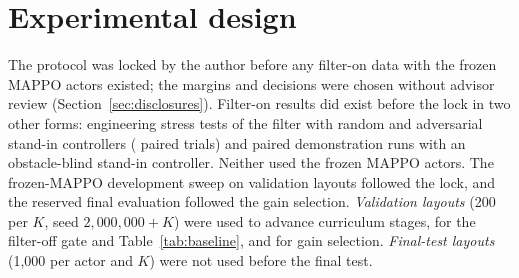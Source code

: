 \documentclass[11pt]{article}
\begin{document}
\section{Experimental design}\label{sec:design}
The protocol was locked by the author before any filter-on data with the frozen MAPPO actors
existed; the margins and decisions were chosen without advisor review
(Section~\ref{sec:disclosures}). Filter-on results did exist before the lock in two other forms:
engineering stress tests of the filter with random and adversarial stand-in controllers
(\EngStressTrials{} paired trials) and paired demonstration runs with an obstacle-blind stand-in
controller. Neither used the frozen MAPPO actors. The frozen-MAPPO development sweep on validation
layouts followed the lock, and the reserved final evaluation followed the gain selection.
\emph{Validation layouts} (200 per $K$, seed $2{,}000{,}000+K$) were used to advance curriculum stages,
for the filter-off gate and Table~\ref{tab:baseline}, and for gain selection. \emph{Final-test layouts}
(1{,}000 per actor and $K$) were not used before the final test.
\end{document}
